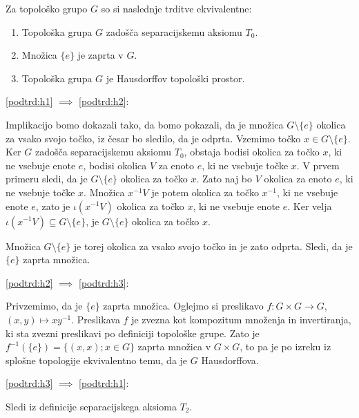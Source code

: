 \documentclass[mat1]{fmfdelo}
\begin{document}
\begin{trditev}\label{trd:t0haus}
Za topološko grupo $G$ so si naslednje trditve ekvivalentne:
\begin{enumerate}
	\item Topološka grupa $G$ zadošča separacijskemu aksiomu $T_0$.\label{podtrd:h1}
	\item Množica $\lbrace e \rbrace$ je zaprta v $G$.\label{podtrd:h2}
	\item Topološka grupa $G$ je Hausdorffov topološki prostor.\label{podtrd:h3}
\end{enumerate}
\end{trditev}

\begin{dokaz}
	\ref{podtrd:h1} $\implies$ \ref{podtrd:h2}:
	
	Implikacijo bomo dokazali tako, da bomo pokazali, da je množica $G\setminus\lbrace e \rbrace$ okolica za vsako svojo točko, iz česar bo sledilo, da je odprta.
	Vzemimo točko $x \in G\setminus\lbrace e \rbrace$. Ker $G$ zadošča separacijskemu aksiomu $T_0$, obstaja bodisi okolica za točko $x$, ki ne vsebuje enote $e$, bodisi okolica $V$ za enoto $e$, ki ne vsebuje točke $x$. V prvem primeru sledi, da je $G\setminus\lbrace e \rbrace$ okolica za točko $x$.
	Zato naj bo $V$ okolica za enoto $e$, ki ne vsebuje točke $x$. Množica $x^{-1}V$ je potem okolica za točko $x^{-1}$, ki ne vsebuje enote $e$, zato je $\iota(x^{-1}V)$ okolica za točko $x$, ki ne vsebuje enote $e$. Ker velja $\iota(x^{-1}V) \subseteq G \setminus \lbrace e \rbrace$, je $G\setminus\lbrace e \rbrace$ okolica za točko $x$.
	
	Množica $G\setminus\lbrace e \rbrace$ je torej okolica za vsako svojo točko in je zato odprta. Sledi, da je $\lbrace e \rbrace$ zaprta množica.
	
	
	\ref{podtrd:h2} $\implies$ \ref{podtrd:h3}:
	
	Privzemimo, da je $\lbrace e \rbrace$ zaprta množica. Oglejmo si preslikavo $f\colon G \times G \to G$, $(x, y) \mapsto xy^{-1}$. Preslikava $f$ je zvezna kot kompozitum množenja in invertiranja, ki sta zvezni preslikavi po definiciji topološke grupe. Zato je $f^{-1}(\lbrace e \rbrace) = \lbrace (x, x) ; x \in G \rbrace$ zaprta množica v $G \times G$, to pa je po izreku iz splošne topologije ekvivalentno temu, da je $G$ Hausdorffova.
	
	\ref{podtrd:h3} $\implies$ \ref{podtrd:h1}:
	
	Sledi iz definicije separacijskega aksioma $T_2$.
\end{dokaz}
\end{document}

